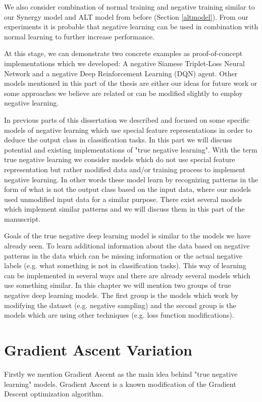 \documentclass[b5paper]{book}
\begin{document}
We also consider combination of normal training and negative training similar to our Synergy model and ALT model from before (Section \ref{altmodel}). From our experiments it is probable that negative learning can be used in combination with normal learning to further increase performance.

At this stage, we can demonstrate two concrete examples as proof-of-concept implementations which we developed: A negative Siamese Triplet-Loss Neural Network and a negative Deep Reinforcement Learning (DQN) agent. Other models mentioned in this part of the thesis are either our ideas for future work or some approaches we believe are related or can be modified slightly to employ negative learning.

In previous parts of this dissertation we described and focused on some specific models of negative learning which use special feature representations in order to deduce the output class in classification tasks. In this part we will discuss potential and existing implementations of "true negative learning". With the term true negative learning we consider models which do not use special feature representation but rather modified data and/or training process to implement negative learning. In other words these model learn by recognizing patterns in the form of what is not the output class based on the input data, where our models used unmodified input data for a similar purpose. There exist several models which implement similar patterns and we will discuss them in this part of the manuscript.

Goals of the true negative deep learning model is similar to the models we have already seen. To learn additional information about the data based on negative patterns in the data which can be missing information or the actual negative labels (e.g. what something is not in classification tasks). This way of learning can be implemented in several ways and there are already several models which use something similar. In this chapter we will mention two groups of true negative deep learning models. The first group is the models which work by modifying the dataset (e.g. negative sampling) and the second group is the models which are using other techniques (e.g. loss function modifications).

\section{Gradient Ascent Variation}

Firstly we mention Gradient Ascent as the main idea behind "true negative learning" models. Gradient Ascent is a known modification of the Gradient Descent optimization algorithm. 
\end{document}
